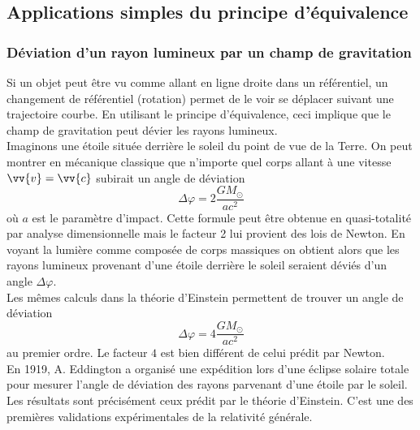 \documentclass[a4paper,11pt]{report}
\begin{document}
        \subsection{Applications simples du principe d'équivalence}
        
            \subsubsection{Déviation d'un rayon lumineux par un champ de gravitation}
            
                Si un objet peut être vu comme allant en ligne droite dans un référentiel, un changement de référentiel (rotation) permet de le voir se déplacer suivant une trajectoire courbe. En utilisant le principe d'équivalence, ceci implique que le champ de gravitation peut dévier les rayons lumineux.\\
                
                Imaginons une étoile située derrière le soleil du point de vue de la Terre. On peut montrer en mécanique classique que n'importe quel corps allant à une vitesse $\vv{v} = \vv{c}$ subirait un angle de déviation
                \begin{equation}
                    \Delta\varphi = 2\frac{GM_\odot}{ac^2}
                \end{equation}
                où $a$ est le paramètre d'impact. Cette formule peut être obtenue en quasi-totalité par analyse dimensionnelle mais le facteur 2 lui provient des lois de Newton. En voyant la lumière comme composée de corps massiques on obtient alors que les rayons lumineux provenant d'une étoile derrière le soleil seraient déviés d'un angle $\Delta\varphi$.\\
                
                Les mêmes calculs dans la théorie d'Einstein permettent de trouver un angle de déviation
                \begin{equation}
                    \Delta\varphi = 4\frac{GM_\odot}{ac^2}
                \end{equation}
                au premier ordre. Le facteur $4$ est bien différent de celui prédit par Newton.\\
                
                En 1919, A. Eddington a organisé une expédition lors d'une éclipse solaire totale pour mesurer l'angle de déviation des rayons parvenant d'une étoile par le soleil. Les résultats sont précisément ceux prédit par le théorie d'Einstein. C'est une des premières validations expérimentales de la relativité générale.
            
\end{document}
